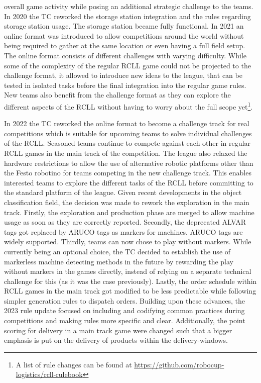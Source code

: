 \documentclass[12pt,twoside]{article}
\begin{document}
 overall game activity while posing an additional strategic challenge to the
 teams.
 In 2020 the \ac{TC} reworked the storage station integration and the rules
 regarding storage station usage. The storage station became fully functional.
 In 2021 an online format was introduced to allow competitions around the
 world without being required to gather at the same location or even having
 a full field setup.
 The online format consists of different challenges with varying difficulty.
 While some of the complexity of the regular \ac{RCLL} game could not be
 projected to the challenge format,
 it allowed to introduce new ideas to the league,
 that can be tested in isolated tasks before the final integration into
 the regular game rules.
 New teams also benefit from the challenge format as they can explore the
 different aspects of the \ac{RCLL} without having to worry about the full scope
 yet\footnote{A list of rule changes can be found at
 \mbox{\url{https://github.com/robocup-logistics/rcll-rulebook}}}.

 In 2022 the \ac{TC} reworked the online format to become a challenge track
 for real competitions which is suitable for upcoming teams to solve individual
 challenges of the \ac{RCLL}.
 Seasoned teams continue to compete against each other in regular \ac{RCLL}
 games in the main track of the competition.
 The league also relaxed the hardware restrictions to allow the use of
 alternative robotic platforms other than the Festo robotino for
 teams competing in the new challenge track.
 This enables interested teams to explore the different tasks of the \ac{RCLL}
 before committing to the standard platform of the league.
 Given recent developments in the object classification field, the
 decision was made to rework the exploration in the main track.
 Firstly, the exploration and production phase are merged to allow machine
 usage as soon as they are correctly reported.
 Secondly, the deprecated ALVAR tags got replaced by ARUCO tags as markers
 for machines. ARUCO tags are widely supported.
 Thirdly, teams can now chose to play without markers.
 While currently being an optional choice, the \ac{TC} decided to establish
 the use of markerless machine detecting methods in the future by rewarding
 the play without markers in the games directly, instead of relying on a
 separate technical challenge for this (as it was the case previously).
 Lastly, the order schedule within \ac{RCLL} games in the main track got
 modified to be less predictable while following simpler generation rules to
 dispatch orders. Building upon these advances, the 2023 rule update focused
 on including and codifying common practices during competitions and making
 rules more specific and clear. Additionally, the point scoring for delivery
 in a main track game were changed such that a bigger emphasis is put on the
 delivery of products within the delivery-windows.
\end{document}
